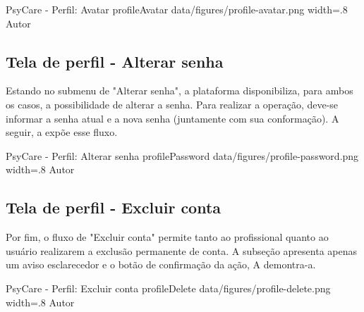 \image
    {PsyCare - Perfil: Avatar}
    {profileAvatar}
    {data/figures/profile-avatar.png}
    {width=.8\textwidth}
    {Autor}

\subsection{Tela de perfil - Alterar senha}
\label{sec:perfilAvatar}
Estando no submenu de "Alterar senha", a plataforma disponibiliza, para ambos os casos, a possibilidade de alterar a senha. Para realizar a operação, deve-se informar a senha atual e a nova senha (juntamente com sua conformação). A seguir, a  expõe esse fluxo.

\image
    {PsyCare - Perfil: Alterar senha}
    {profilePassword}
    {data/figures/profile-password.png}
    {width=.8\textwidth}
    {Autor}

\subsection{Tela de perfil - Excluir conta}
\label{sec:perfilAvatar}
Por fim, o fluxo de "Excluir conta" permite tanto ao profissional quanto ao usuário realizarem a exclusão permanente de conta. A subseção apresenta apenas um aviso esclarecedor e o botão de confirmação da ação, A  demontra-a.

\image
    {PsyCare - Perfil: Excluir conta}
    {profileDelete}
    {data/figures/profile-delete.png}
    {width=.8\textwidth}
    {Autor}